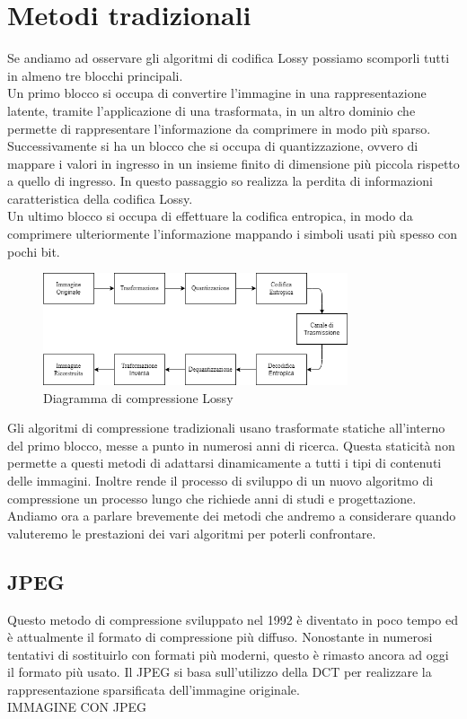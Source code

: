 \chapter{Metodi tradizionali}
Se andiamo ad osservare gli algoritmi di codifica Lossy possiamo scomporli tutti in almeno tre blocchi principali. \cite{sadeeq2021image} \\
Un primo blocco si occupa di convertire l’immagine in una rappresentazione latente, tramite l’applicazione di una trasformata, in un altro dominio che permette di rappresentare l’informazione da comprimere in modo più sparso.\\
Successivamente si ha un blocco che si occupa di quantizzazione, ovvero di mappare i valori in ingresso in un insieme finito di dimensione più piccola rispetto a quello di ingresso. In questo passaggio so realizza la perdita di informazioni caratteristica della codifica Lossy.\\
Un ultimo blocco si occupa di effettuare la codifica entropica, in modo da comprimere ulteriormente l’informazione mappando i simboli usati più spesso con pochi bit.

\begin{figure}[ht]
    \centering
    \includegraphics[width=0.8\textwidth]{Immagini/LossyCompressorDiagram.png}
    \caption{Diagramma di compressione Lossy}
    \label{fig:LossyCompressorDiagram}
\end{figure}

Gli algoritmi di compressione tradizionali usano trasformate statiche all’interno del primo blocco, messe a punto in numerosi anni di ricerca. Questa staticità non permette a questi metodi di adattarsi dinamicamente a tutti i tipi di contenuti delle immagini. \cite{cheng2018deep}  Inoltre rende il processo di sviluppo di un nuovo algoritmo di compressione un processo lungo che richiede anni di studi e progettazione. \cite{ cheng2018deep}
Andiamo ora a parlare brevemente dei metodi che andremo a considerare quando valuteremo le prestazioni dei vari algoritmi per poterli confrontare.

\section{JPEG}
Questo metodo di compressione sviluppato nel 1992 è diventato in poco tempo ed è attualmente il formato di compressione più diffuso. Nonostante in numerosi tentativi di sostituirlo con formati più moderni, questo è rimasto ancora ad oggi il formato più usato. Il JPEG si basa sull’utilizzo della DCT per realizzare la rappresentazione sparsificata dell’immagine originale. \cite{ 125072} \\
IMMAGINE CON JPEG

